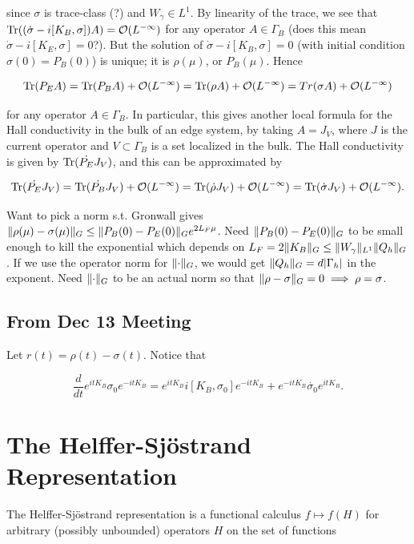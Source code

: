 \documentclass[12pt, letterpaper]{article}
\begin{document}
since $\sigma$ is trace-class (?) and $W_\gamma \in L^1$. By linearity of the trace, we see that $\text{Tr}((\dot{\sigma} - i[K_B,\sigma])A) = \mathcal{O}(L^{-\infty})$ for any operator $A \in \Gamma_B$ (does this mean $\dot{\sigma}-i[K_E,\sigma] = 0$?). But the solution of $\dot{\sigma} - i[K_B,\sigma] = 0$ (with initial condition $\sigma(0)=P_B(0)$) is unique; it is $\rho(\mu)$, or $P_B(\mu)$. Hence

\[\text{Tr}(P_E A) = \text{Tr}(P_B A) + \mathcal{O}(L^{-\infty}) = \text{Tr}(\rho A) + \mathcal{O}(L^{-\infty}) = Tr(\sigma A) + \mathcal{O}(L^{-\infty}) \]

for any operator $A\in\Gamma_B$. In particular, this gives another local formula for the Hall conductivity in the bulk of an edge system, by taking $A = J_V$, where $J$ is the current operator and $V \subset \Gamma_B$ is a set localized in the bulk. The Hall conductivity is given by $\text{Tr}(\dot{P_E}J_V)$, and this can be approximated by

\[\text{Tr}(\dot{P_E} J_V) = \text{Tr}(\dot{P_B} J_V) + \mathcal{O}(L^{-\infty}) = \text{Tr}(\dot{\rho} J_V) + \mathcal{O}(L^{-\infty}) = \text{Tr}(\dot{\sigma} J_V) + \mathcal{O}(L^{-\infty}).\]

Want to pick a norm s.t. Gronwall gives $\lVert \rho(\mu)-\sigma(\mu) \rVert_G \leq \lVert P_B(0)-P_E(0) \rVert_Ge^{2L_F\mu}$. Need $\lVert P_B(0)-P_E(0) \rVert_G$ to be small enough to kill the exponential which depends on $L_F = 2\lVert K_B \rVert_G \leq \lVert W_\gamma \rVert_{L^1}\lVert Q_h \rVert_G$. If we use the operator norm for $\lVert \cdot \rVert_G$, we would get $\lVert Q_h \rVert_G = d|\Gamma_h|$ in the exponent. Need $\lVert \cdot \rVert_G$ to be an actual norm so that $\lVert \rho-\sigma \rVert_G = 0 \implies \rho = \sigma$.

\subsection*{From Dec 13 Meeting}

Let $r(t) = \rho(t)-\sigma(t)$. Notice that 

\[\frac{d}{dt} e^{itK_B}\sigma_0e^{-itK_B} = e^{itK_B}i[K_B,\sigma_0]e^{-itK_B} + e^{-itK_B}\dot{\sigma_0}e^{itK_B}.\]

\section{The Helffer-Sj\"{o}strand Representation}\label{sec:helffersjostrand}

The Helffer-Sj\"{o}strand representation is a functional calculus $f \mapsto f(H)$ for arbitrary (possibly unbounded) operators $H$ on the set of functions 
\end{document}
